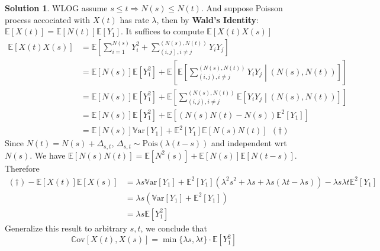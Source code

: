 \documentclass[a4paper, 10pt]{article}
\theoremstyle{definition}
\theoremstyle{hSol}
\newtheorem*{solution}{Solution}
\begin{document}
\begin{solution} WLOG assume $s\leq t \Rightarrow N(s)\leq N(t)$. And suppose Poisson process accociated with $X(t)$ has rate $\lambda$, then by \textbf{Wald's Identity}: $\mathbb{E}\left[X(t)\right]=\mathbb{E}\left[N(t)\right]\mathbb{E}\left[Y_1\right]$. It suffices to compute $\mathbb{E}\left[X(t)X(s)\right]$
\begin{equation}
  \begin{split}
    \mathbb{E}\left[X(t)X(s)\right] &= \mathbb{E}\left[\sum_{i=1}^{N(s)}Y_i^2 + \sum_{(i,j),i\ne j}^{(N(s),N(t))}Y_iY_j\right]\\
    &= \mathbb{E}\left[N(s)\right] \mathbb{E}\left[Y_1^2\right] + \mathbb{E}\left[\mathbb{E}\left[\sum_{(i,j),i\ne j}^{(N(s),N(t))}Y_iY_j\middle|(N(s),N(t))\right]\right] \\
    &= \mathbb{E}\left[N(s)\right] \mathbb{E}\left[Y_1^2\right] + \mathbb{E}\left[\sum_{(i,j),i\ne j}^{(N(s),N(t))}\mathbb{E}\left[Y_iY_j\middle|(N(s),N(t))\right]\right] \\
    &= \mathbb{E}\left[N(s)\right] \mathbb{E}\left[Y_1^2\right] + \mathbb{E}\left[\left(N(s)N(t)-N(s)\right)\mathbb{E}^2\left[Y_1\right]\right]\\
    &= \mathbb{E}\left[N(s)\right]\mathrm{\mathbb{V}ar}\left[Y_1\right] + \mathbb{E}^2\left[Y_1\right] \mathbb{E}\left[N(s)N(t)\right]~~(\dag)
  \end{split}
\end{equation}
Since $N(t)=N(s)+\Delta_{s,t}$, $\Delta_{s,t}\sim \text{Pois}(\lambda(t-s))$ and independent wrt $N(s)$. We have $\mathbb{E}\left[N(s)N(t)\right]=\mathbb{E}\left[N^2(s)\right]+\mathbb{E}\left[N(s)\right] \mathbb{E}\left[N(t-s)\right]$. Therefore
\begin{equation}
  \begin{split}
    (\dag)-\mathbb{E}\left[X(t)\right]\mathbb{E}\left[X(s)\right] &= \lambda s \mathrm{\mathbb{V}ar}\left[Y_1\right] + \mathbb{E}^2\left[Y_1\right] \left(\lambda^2 s^2+\lambda s +\lambda s(\lambda t - \lambda s)\right) - \lambda s \lambda t \mathbb{E}^2\left[Y_1\right] \\
    &= \lambda s (\mathrm{\mathbb{V}ar}\left[Y_1\right] + \mathbb{E}^2\left[Y_1\right])\\
    &= \lambda s \mathbb{E}\left[Y_1^2\right]
  \end{split}
\end{equation}
Generalize this result to arbitrary $s,t$, we conclude that
\begin{equation}
  \mathrm{\mathbb{C}ov}\left[X(t), X(s)\right] = \min\{\lambda s,\lambda t\}\cdot \mathbb{E}\left[Y_1^2\right]
\end{equation}
\end{solution}
\end{document}

